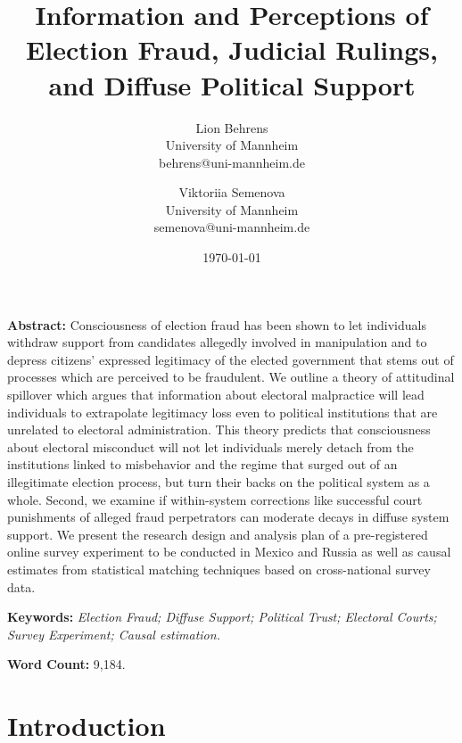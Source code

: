 \documentclass[11pt, ngerman,english,a4]{article}
\author{
	Lion Behrens\\University of Mannheim\\behrens@uni-mannheim.de\\
	\and
	Viktoriia Semenova\\University of Mannheim\\semenova@uni-mannheim.de
}
\date{\today }
\title{Information and Perceptions of Election Fraud, Judicial Rulings, \\ and Diffuse Political Support\vspace{0.7cm}}
\begin{document}
\maketitle
\thispagestyle{empty}

\onehalfspacing


\noindent \textbf{Abstract:} Consciousness of election fraud has been shown to let individuals withdraw support from candidates allegedly involved in manipulation and to depress citizens' expressed legitimacy of the elected government that stems out of processes which are perceived to be fraudulent. We outline a theory of attitudinal spillover which argues that information about electoral malpractice will lead individuals to extrapolate legitimacy loss even to political institutions that are unrelated to electoral administration. This theory predicts that consciousness about electoral misconduct will not let individuals merely detach from the institutions linked to misbehavior and the regime that surged out of an illegitimate election process, but turn their backs on the political system as a whole. Second, we examine if within-system corrections like successful court punishments of alleged fraud perpetrators can moderate decays in diffuse system support. We present the research design and analysis plan of a pre-registered online survey experiment to be conducted in Mexico and Russia as well as causal estimates from statistical matching techniques based on cross-national survey data.

\vspace{1cm}

\noindent \textbf{Keywords:} \textit{Election Fraud; Diffuse Support; Political Trust; Electoral Courts; Survey Experiment; Causal estimation.} \\ 


\vspace{2cm}

\begin{center}
  \textbf{Word Count:} 9,184.  
\end{center}



\newpage
\setcounter{page}{1}
\doublespacing

\section*{Introduction}
\end{document}
